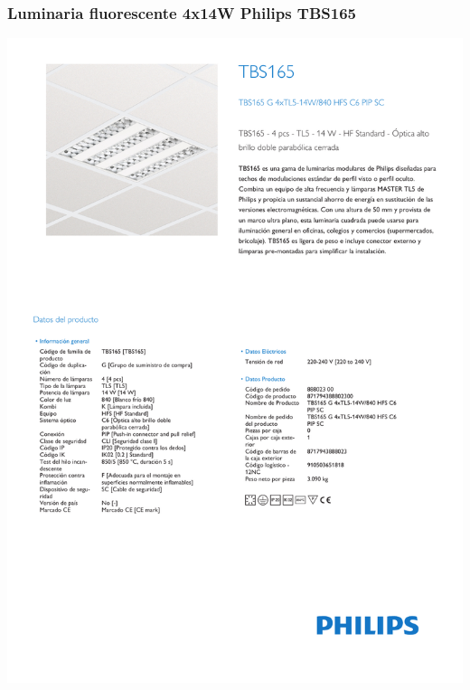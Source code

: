 \subsubsection{Luminaria fluorescente 4x14W Philips TBS165}
\hspace*{-2cm}
\includegraphics[page=1]{Datasheets/ph2.pdf}
\newpage
\hspace*{-2cm}
